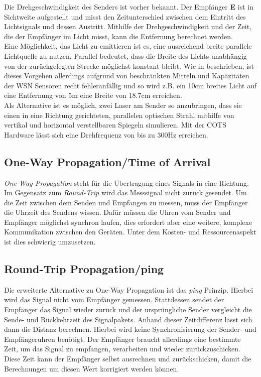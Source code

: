 \documentclass[12pt, a4wide]{scrreprt}
\begin{document}
Die Drehgeschwindigkeit des Senders ist vorher bekannt. Der Empfänger {\bf E} ist in Sichtweite aufgestellt und misst den Zeitunterschied zwischen dem Eintritt des Lichtsignals und dessen Austritt. Mithilfe der Drehgeschwindigkeit und der Zeit, die der Empfänger im Licht misst, kann die Entfernung berechnet werden.\\
\indent
Eine Möglichkeit, das Licht zu emittieren ist es, eine ausreichend breite parallele Lichtquelle zu nutzen. Parallel bedeutet, dass die Breite des Lichts unabhängig von der zurückgelegten Strecke möglichst konstant bleibt. Wie in \cite{lighthouse} beschrieben, ist dieses Vorgehen allerdings aufgrund von beschränkten Mitteln und Kapäzitäten der WSN Sensoren recht fehleranfällig und so wird z.B. ein 10cm breites Licht auf eine Entfernung von 5m eine Breite von 18.7cm erreichen.\\
\indent
Als Alternative ist es möglich, zwei Laser am Sender so anzubringen, dass sie einen in eine Richtung gerichteten, parallelen optischen Strahl mithilfe von vertikal und horizontal verstellbaren Spiegeln simulieren. Mit der COTS Hardware lässt sich eine Drehfrequenz von bis zu 300Hz\cite{lighthouse} erreichen. 
\newpage
    \subsection{One-Way Propagation/Time of Arrival}
\textit{One-Way Propagation} steht für die Übertragung eines Signals in eine Richtung. Im Gegensatz zum \textit{Round-Trip} wird das Messsignal nicht zurück gesendet. Um die Zeit zwischen dem Senden und Empfangen zu messen, muss der Empfänger die Uhrzeit des Sendens wissen. Dafür müssen die Uhren vom Sender und Empfänger möglichst synchron laufen, dies erfordert aber eine weitere, komplexe Kommunikation zwischen den Geräten. Unter dem Kosten- und Ressourcenaspekt ist dies schwierig umzusetzen.
	\subsection{Round-Trip Propagation/ping}
Die erweiterte Alternative zu One-Way Propagation ist das \textit{ping} Prinzip. Hierbei wird das Signal nicht vom Empfänger gemessen. Stattdessen sendet der Empfänger das Signal wieder zurück und der ursprüngliche Sender vergleicht die Sende- und Rückkehrzeit des Signalpakets. Anhand dieser Zeitdifferenz lässt sich dann die Distanz berechnen. Hierbei wird keine Synchronisierung der Sender- und Empfängeruhren benötigt. Der Empfänger braucht allerdings eine bestimmte Zeit, um das Signal zu empfangen, verarbeiten und wieder zurückzuschicken. Diese Zeit kann der Empfänger selbst ausrechnen und zurückschicken, damit die Berechnungen um diesen Wert korrigiert werden können.\\
\end{document}
